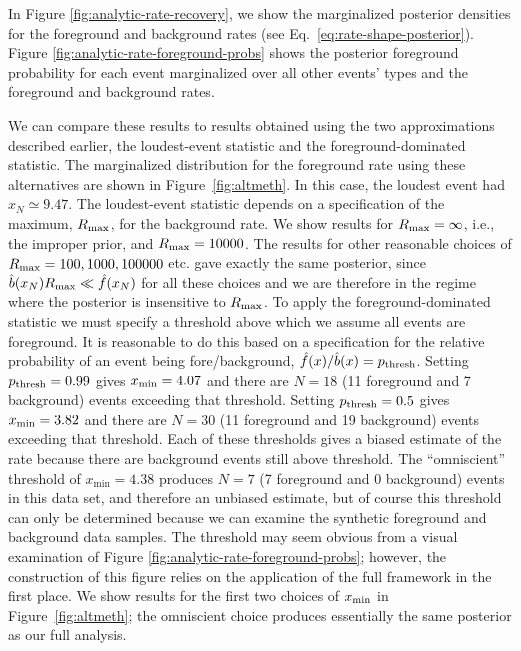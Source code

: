\documentclass[aps,prd,reprint,nofootinbib]{revtex4-1}
\begin{document}
In Figure \ref{fig:analytic-rate-recovery}, we show the marginalized
posterior densities for the foreground and background rates (see
Eq.~\eqref{eq:rate-shape-posterior}).  Figure
\ref{fig:analytic-rate-foreground-probs} shows the posterior
foreground probability for each event marginalized over all other
events' types and the foreground and background rates.

We can compare these results to results obtained using the two
approximations described earlier, the loudest-event statistic and the
foreground-dominated statistic. The marginalized distribution for the
foreground rate using these alternatives are shown in
Figure~\ref{fig:altmeth}. In this case, the loudest event had
$x_N\simeq 9.47$. The loudest-event statistic depends on a
specification of the maximum, $R_{\rm max}$, for the background
rate. We show results for $R_{\rm max}=\infty$, i.e., the improper
prior, and $R_{\rm max}=10000$. The results for other reasonable
choices of $R_{\rm max} = 100, 1000, 100000$ etc. gave exactly the
same posterior, since $\hat{b}(x_N) R_{\rm max} \ll \hat{f}(x_N)$ for
all these choices and we are therefore in the regime where the
posterior is insensitive to $R_{\rm max}$. To apply the
foreground-dominated statistic we must specify a threshold above which
we assume all events are foreground. It is reasonable to do this based
on a specification for the relative probability of an event being
fore/background, $\hat{f}(x)/\hat{b}(x)=p_{\rm thresh}$. Setting
$p_{\rm thresh}=0.99$ gives $x_{\rm min}=4.07$ and there are $N=18$
(11 foreground and 7 background) events exceeding that
threshold. Setting $p_{\rm thresh}=0.5$ gives $x_{\rm min}=3.82$ and
there are $N=30$ (11 foreground and 19 background) events exceeding
that threshold.  Each of these thresholds gives a biased estimate of
the rate because there are background events still above threshold.
The ``omniscient'' threshold of $x_\mathrm{min} = 4.38$ produces $N=7$
(7 foreground and 0 background) events in this data set, and therefore
an unbiased estimate, but of course this threshold can only be
determined because we can examine the synthetic foreground and
background data samples. The threshold may seem obvious from a 
visual examination of Figure \ref{fig:analytic-rate-foreground-probs}; 
however, the construction of this figure relies on the application of the full
framework in the first place.  We show results for the first two choices of
$x_{\rm min}$ in Figure~\ref{fig:altmeth}; the omniscient choice
produces essentially the same posterior as our full analysis.
\end{document}
